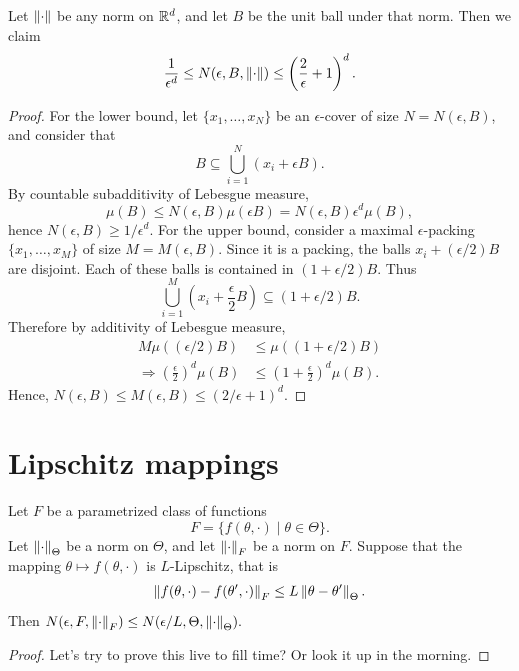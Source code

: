 \documentclass[11pt]{article}
\begin{document}
\begin{example}
  Let $\left\lVert\cdot\right\rVert$ be any norm on $\mathbb{R}^d$, and let $B$ be the unit ball under that norm.
  Then 
  we claim
  $$
  \frac{1}{\epsilon^d} \le N(\epsilon, B, \left\lVert\cdot\right\rVert) \le \left(\frac{2}{\epsilon} + 1\right)^d.
  $$
\end{example}
\begin{proof}
  For the lower bound, let $\{x_1,\ldots, x_N\}$ be an $\epsilon$-cover of size
  $N = N(\epsilon, B)$, 
  and consider that
  $$
  B \subseteq \bigcup_{i=1}^N (x_i + \epsilon B).
  $$
  By countable subadditivity of Lebesgue measure,
  $$
  \mu(B) \le N(\epsilon, B)\mu(\epsilon B) = N(\epsilon, B)\epsilon^d \mu(B),
  $$
  hence
  $N(\epsilon, B) \ge 1/\epsilon^d$.
  For the upper bound, consider a maximal $\epsilon$-packing $\{x_1,\ldots, x_M\}$ of size 
  $M = M(\epsilon, B)$. Since it is a packing, the balls $x_i + (\epsilon / 2)B$ are
  disjoint.
  Each of these balls is contained in $(1+\epsilon / 2)B$. 
  Thus
  $$
\bigcup_{i=1}^M (x_i + \frac{\epsilon}{2}B) \subseteq (1+\epsilon/2)B.
  $$
  Therefore
  by additivity of Lebesgue measure,
  \begin{align*}
    M\mu((\epsilon/2)B) &\le \mu((1+\epsilon/2)B)\\
    \Longrightarrow \left(\frac{\epsilon}{2}\right)^d\mu(B)&\le \left(1+\frac{\epsilon}{2}\right)^d\mu(B).
  \end{align*}
  Hence, $N(\epsilon, B) \le M(\epsilon, B) \le (2/\epsilon + 1)^d$.
\end{proof}
\section{Lipschitz mappings}
  \begin{theorem}
  Let $F$ be a parametrized class of functions
  $$
  F = \{f(\theta, \cdot) \mid \theta \in \Theta\}.
  $$
  Let $\left\lVert\cdot\right\rVert_\Theta$ be a norm on $\Theta$, and let $\left\lVert\cdot\right\rVert_F$ be a norm on $F$.
  Suppose that the mapping $\theta\mapsto f(\theta,\cdot)$ is $L$-Lipschitz, that is
  $$
  \left\lVert f(\theta,\cdot) - f(\theta', \cdot)\right\rVert_F \le L\left\lVert\theta - \theta'\right\rVert_{\Theta}.
  $$
  Then $N(\epsilon, F, \left\lVert\cdot\right\rVert_F)\le N(\epsilon/L, \Theta, \left\lVert\cdot\right\rVert_\Theta).$
  \end{theorem}
  \begin{proof}
    Let's try to prove this live to fill time? Or look it up in the morning.
  \end{proof}
\end{document}
